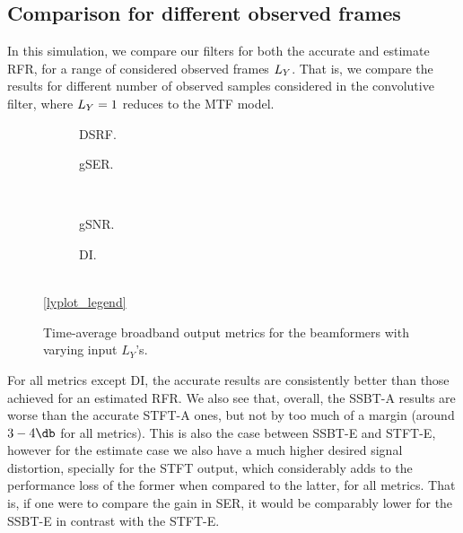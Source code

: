 \subsection{Comparison for different observed frames}

In this simulation, we compare our filters for both the accurate and estimate RFR, for a range of considered observed frames $\Ly$. That is, we compare the results for different number of observed samples considered in the convolutive filter, where $\Ly = 1$ reduces to the MTF model.

\begin{figure}[!ht]
	\centering
	\begin{subfigure}{0.49\textwidth}
		\centering
		
		\caption{DSRF.}
		\label{subfig:lineplot__DSRF__iSER_n15__Ly_var}
	\end{subfigure}\hfill
	\begin{subfigure}{0.49\textwidth}
		\centering
		
		\caption{gSER.}
		\label{subfig:lineplot__gSER__iSER_n15__Ly_var}
	\end{subfigure}\\[1em]
	\begin{subfigure}{0.49\textwidth}
		\centering
		
		\caption{gSNR.}
		\label{subfig:lineplot__gSNR__iSER_n15__Ly_var}
	\end{subfigure}\hfill
	\begin{subfigure}{0.49\textwidth}
		\centering
		
		\caption{DI.}
		\label{subfig:lineplot__DI__iSER_n15__Ly_var}
	\end{subfigure}\\[1em]
	\ref*{lyplot_legend}
	\caption{Time-average broadband output metrics for the beamformers with varying input $L_Y$'s.}
	\label{fig:lineplot__iSER_n15__Ly_var}
\end{figure}

For all metrics except DI, the accurate results are consistently better than those achieved for an estimated RFR. We also see that, overall, the SSBT-A results are worse than the accurate STFT-A ones, but not by too much of a margin (around $3-4\dB$ for all metrics). This is also the case between SSBT-E and STFT-E, however for the estimate case we also have a much higher desired signal distortion, specially for the STFT output, which considerably adds to the performance loss of the former when compared to the latter, for all metrics. That is, if one were to compare the gain in SER, it would be comparably lower for the SSBT-E in contrast with the STFT-E.

